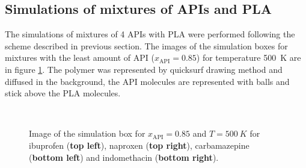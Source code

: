 \subsection{Simulations of mixtures of APIs and PLA}
The simulations of mixtures of 4 APIs with PLA were performed following the scheme described in previous section. The images of the simulation boxes for mixtures with the least amount of API ($x_{\text{API}}=0.85$) for temperature 500~K are in figure \ref{fig:mix_boxes}. The polymer was represented by quicksurf drawing method and diffused in the background, the API molecules are represented with balls and stick above the PLA molecules.

\begin{figure}[htb!]
	\centering
	\hspace{0.2cm}
	\\
	\vspace{0.2cm}
	\hspace{0.2cm}
	\caption{Image of the simulation box for $x_{\text{API}}=0.85$ and $T=500~K$ for ibuprofen (\textbf{top left}), naproxen (\textbf{top right}), carbamazepine (\textbf{bottom left}) and indomethacin (\textbf{bottom right}).}
	\label{fig:mix_boxes}
\end{figure}
\vspace{-0.5cm}
